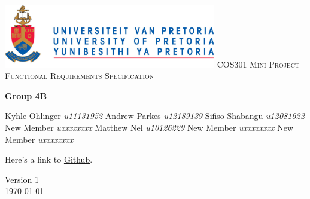\begin{titlepage}
\begin{center}
\includegraphics[width=350px]{University_of_Pretoria_Logo.png}\newline
\textsc{\LARGE COS301 Mini Project Functional Requirements Specification}\newline


\textbf{Group 4B} \\
\begin{flushright} \large
Kyhle Ohlinger \emph{u11131952} \newline
Andrew Parkes \emph{u12189139} \newline
Sifiso Shabangu \emph{u12081622} \newline
New Member \emph{uxxxxxxxx} \newline
Matthew Nel \emph{u10126229} \newline
New Member \emph{uxxxxxxxx} \newline
New Member \emph{uxxxxxxxx} \newline \newline \newline
\end{flushright}
Here's a link to \href{https://github.com/KyhleOhlinger/COS301-Group-4_B.git}{Github}.


\vfill

{\large Version 1}
\\
{\large \today}

\end{center}
\end{titlepage}
